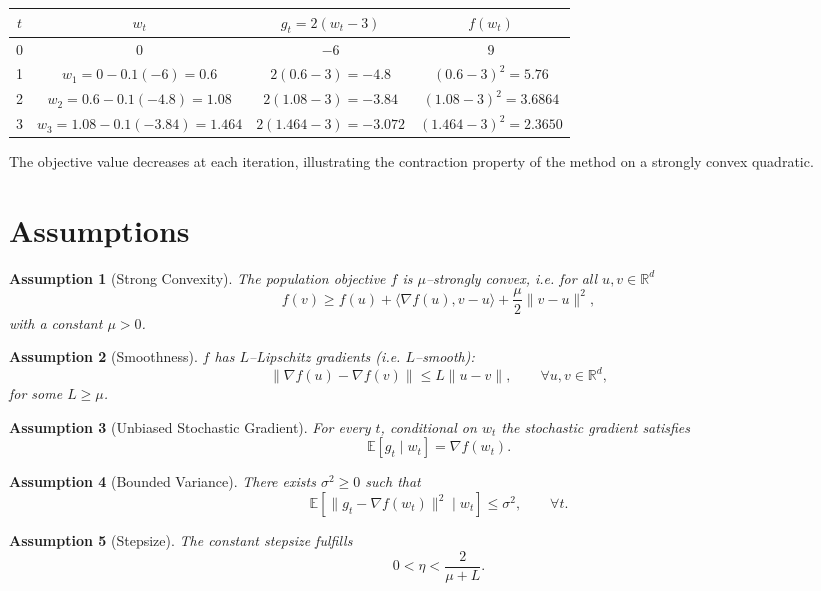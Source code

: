 \documentclass[11pt]{article}
\newtheorem{assumption}{Assumption}
\newcommand{\E}{\mathbb{E}}
\newcommand{\R}{\mathbb{R}}
\begin{document}
\begin{center}
\begin{tabular}{c|c|c|c}
$t$ & $w_{t}$ & $g_{t}=2(w_{t}-3)$ & $f(w_{t})$\\ \hline
0 & $0$ & $-6$ & $9$\\
1 & $w_{1}=0-0.1(-6)=0.6$ & $2(0.6-3)=-4.8$ & $(0.6-3)^{2}=5.76$\\
2 & $w_{2}=0.6-0.1(-4.8)=1.08$ & $2(1.08-3)=-3.84$ & $(1.08-3)^{2}=3.6864$\\
3 & $w_{3}=1.08-0.1(-3.84)=1.464$ & $2(1.464-3)=-3.072$ & $(1.464-3)^{2}=2.3650$
\end{tabular}
\end{center}
The objective value decreases at each iteration, illustrating the contraction property of the method on a strongly convex quadratic.

\newpage
\section*{Assumptions}
\begin{assumption}[Strong Convexity]\label{ass:strong}
The population objective $f$ is $\mu$–strongly convex, i.e. for all $u,v\in\R^{d}$
\[
f(v)\ge f(u)+\langle\nabla f(u),v-u\rangle+\frac{\mu}{2}\|v-u\|^{2},
\]
with a constant $\mu>0$.
\end{assumption}

\begin{assumption}[Smoothness]\label{ass:smooth}
$f$ has $L$–Lipschitz gradients (i.e. $L$–smooth):
\[
\|\nabla f(u)-\nabla f(v)\|\le L\|u-v\|,\qquad\forall u,v\in\R^{d},
\]
for some $L\ge\mu$.
\end{assumption}

\begin{assumption}[Unbiased Stochastic Gradient]\label{ass:unbiased}
For every $t$, conditional on $w_{t}$ the stochastic gradient satisfies
\[
\E\!\left[g_{t}\mid w_{t}\right]=\nabla f(w_{t}).
\]
\end{assumption}

\begin{assumption}[Bounded Variance]\label{ass:variance}
There exists $\sigma^{2}\ge0$ such that
\[
\E\!\left[\|g_{t}-\nabla f(w_{t})\|^{2}\mid w_{t}\right]\le\sigma^{2},
\qquad\forall t.
\]
\end{assumption}

\begin{assumption}[Stepsize]\label{ass:stepsize}
The constant stepsize fulfills
\[
0<\eta<\frac{2}{\mu+L}.
\]
\end{assumption}
\end{document}
